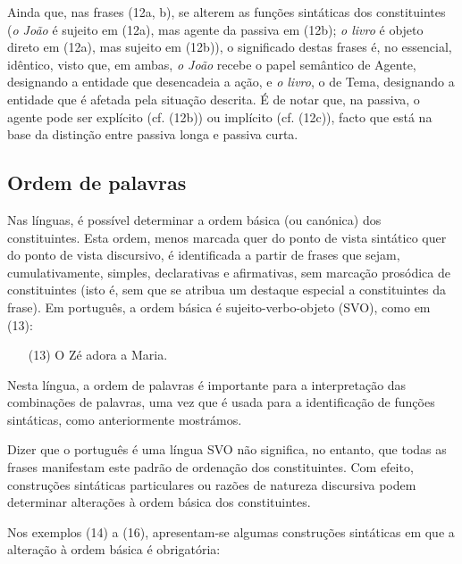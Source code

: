\documentclass[output=paper,colorlinks,citecolor=brown,booklanguage=portuguese]{langscibook}
\begin{document}
Ainda que, nas frases (12a, b), se alterem as funções sintáticas dos constituintes (\emph{o João} é sujeito em (12a), mas agente da passiva em (12b); \emph{o livro} é objeto direto em (12a), mas sujeito em (12b)), o significado destas frases é, no essencial, idêntico, visto que, em ambas, \emph{o João} recebe o papel semântico de Agente, designando a entidade que desencadeia a ação, e \emph{o livro}, o de Tema, designando a entidade que é afetada pela situação descrita. É de notar que, na passiva, o agente pode ser explícito (cf. (12b)) ou implícito (cf. (12c)), facto que está na base da distinção entre passiva longa e passiva curta.

\subsection{Ordem de palavras}\label{sec:cap12sec2.3}
Nas línguas, é possível determinar a ordem básica (ou canónica) dos constituintes. Esta ordem, menos marcada quer do ponto de vista sintático quer do ponto de vista discursivo, é identificada a partir de frases que sejam, cumulativamente, simples, declarativas e afirmativas, sem marcação prosódica de constituintes (isto é, sem que se atribua um destaque especial a constituintes da frase). Em português, a ordem básica é sujeito-verbo-objeto (SVO), como em (13):

\begin{enumerate}[align=left]
    \item [(13)] O Zé adora a Maria.
\end{enumerate}

Nesta língua, a ordem de palavras é importante para a interpretação das combinações de palavras, uma vez que é usada para a identificação de funções sintáticas, como anteriormente mostrámos.

Dizer que o português é uma língua SVO não significa, no entanto, que todas as frases manifestam este padrão de ordenação dos constituintes. Com efeito, construções sintáticas particulares ou razões de natureza discursiva podem determinar alterações à ordem básica dos constituintes.

Nos exemplos (14) a (16), apresentam-se algumas construções sintáticas em que a alteração à ordem básica é obrigatória: 
\end{document}
